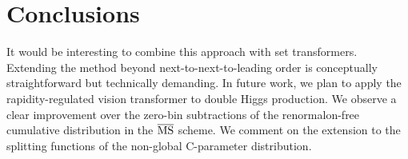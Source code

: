 \section{Conclusions}\label{sec:conclusions}

It would be interesting to combine this approach with set transformers.
Extending the method beyond next-to-next-to-leading order is
conceptually straightforward but technically demanding. In future work,
we plan to apply the rapidity-regulated vision transformer to double
Higgs production. We observe a clear improvement over the zero-bin
subtractions of the renormalon-free cumulative distribution in the
$\overline{\rm MS}$ scheme. We comment on the extension to the splitting
functions of the non-global C-parameter distribution.

